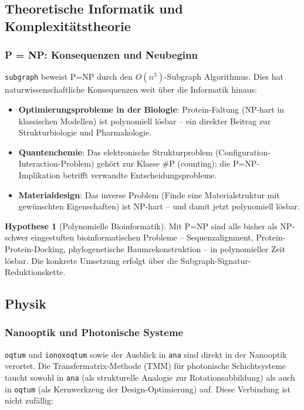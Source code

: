 ﻿\documentclass[a4paper,12pt]{scrreprt}
\theoremstyle{definition}
\newtheorem{hypothese}{Hypothese}[section]
\begin{document}
\subsection{Theoretische Informatik und Komplexitätstheorie}

\subsubsection{P = NP: Konsequenzen und Neubeginn}

\texttt{subgraph} beweist P=NP durch den $O(n^3)$-Subgraph Algorithmus.
Dies hat naturwissenschaftliche Konsequenzen weit über die Informatik hinaus:

\begin{itemize}
  \item \textbf{Optimierungsprobleme in der Biologie}: Protein-Faltung
    (NP-hart in klassischen Modellen) ist polynomiell lösbar -- ein
    direkter Beitrag zur Strukturbiologie und Pharmakologie.
  \item \textbf{Quantenchemie}: Das elektronische Strukturproblem
    (Configuration-Interaction-Problem) gehört zur Klasse \#P (counting);
    die P=NP-Implikation betrifft verwandte Entscheidungsprobleme.
  \item \textbf{Materialdesign}: Das inverse Problem (Finde eine
    Materialstruktur mit gewünschten Eigenschaften) ist NP-hart -- und
    damit jetzt polynomiell lösbar.
\end{itemize}

\begin{hypothese}[Polynomielle Bioinformatik]
  Mit P=NP sind alle bisher als NP-schwer eingestuften bioinformatischen
  Probleme -- Sequenzalignment, Protein-Protein-Docking, phylogenetische
  Baumrekonstruktion -- in polynomieller Zeit lösbar. Die konkrete
  Umsetzung erfolgt über die Subgraph-Signatur-Reduktionskette.
\end{hypothese}

\subsection{Physik}

\subsubsection{Nanooptik und Photonische Systeme}

\texttt{oqtum} und \texttt{ionoxoqtum} sowie der Ausblick in \texttt{ana}
sind direkt in der Nanooptik verortet. Die Transfermatrix-Methode (TMM)
für photonische Schichtsysteme taucht sowohl in \texttt{ana} (als strukturelle
Analogie zur Rotationsabbildung) als auch in \texttt{oqtum} (als Kernwerkzeug
der Design-Optimierung) auf. Diese Verbindung ist nicht zufällig:
\end{document}
